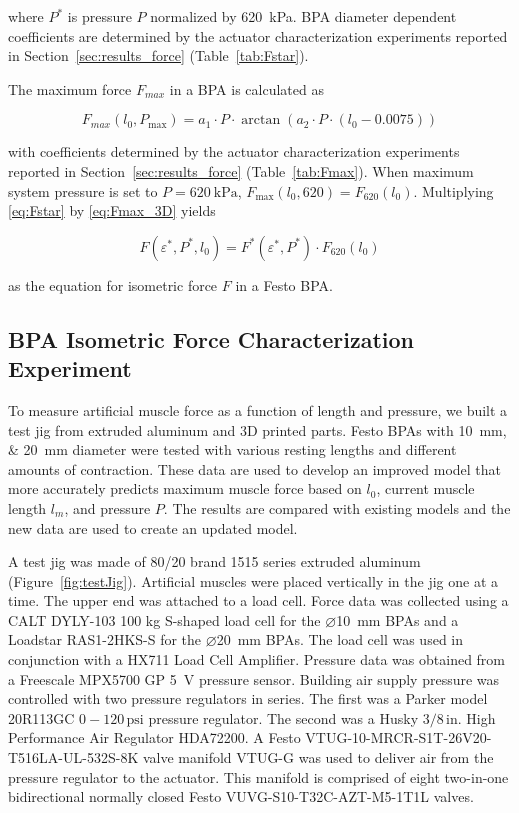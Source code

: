 where $P^*$ is pressure $P$ normalized by \qty{620}{\kPa}. BPA diameter dependent coefficients are determined by the actuator characterization experiments reported in Section~\ref{sec:results_force} (Table~\ref{tab:Fstar}).

The maximum force $F_{max}$ in a BPA is calculated as

\begin{equation}
    F_{max}(l_{0},P_\text{max}) = a_1 \cdot P \cdot \arctan{(a_2 \cdot P \cdot (l_{0}-0.0075))} \label{eq:Fmax_3D}
\end{equation}

with coefficients determined by the actuator characterization experiments reported in Section~\ref{sec:results_force} (Table~\ref{tab:Fmax}). When maximum system pressure is set to $P=\qty{620}{\kPa}$, $F_\text{max}(l_{0},620) = F_{620}(l_{0})$. Multiplying \eqref{eq:Fstar} by \eqref{eq:Fmax_3D} yields

 \begin{equation}
   F(\varepsilon^*,P^*,l_{0}) = F^*(\varepsilon^*,P^*) \cdot F_{620}(l_{0}) \label{eq:force}
\end{equation}

as the equation for isometric force $F$ in a Festo BPA.

\subsection{BPA Isometric Force Characterization Experiment}\label{sec:force_experiment}


To measure artificial muscle force as a function of length and pressure, we built a test jig from extruded aluminum and 3D printed parts. Festo BPAs with \qtylist{10;20}{\mm} diameter were tested with various resting lengths and different amounts of contraction. These data are used to develop an improved model that more accurately predicts maximum muscle force based on $l_0$, current muscle length $l_{m}$, and pressure $P$. The results are compared with existing models and the new data are used to create an updated model. 

A test jig was made of 80/20 brand 1515 series extruded aluminum (Figure~\ref{fig:testJig}). Artificial muscles were placed vertically in the jig one at a time. The upper end was attached to a load cell.
Force data was collected using a CALT DYLY-103 100 kg S-shaped load cell for the $\diameter$\qty{10}{\mm} BPAs and a Loadstar RAS1-2HKS-S for the $\diameter$\qty{20}{\mm} BPAs. The load cell was used in conjunction with a HX711 Load Cell Amplifier. Pressure data was obtained from a Freescale MPX5700 GP \qty{5}{\volt} pressure sensor. Building air supply pressure was controlled with two pressure regulators in series. The first was a Parker model 20R113GC $0-120\,\text{psi}$ pressure regulator. The second was a Husky $3/8\,\text{in.}$ High Performance Air Regulator HDA72200. A Festo VTUG-10-MRCR-S1T-26V20-T516LA-UL-532S-8K valve manifold VTUG-G was used to deliver air from the pressure regulator to the actuator. This manifold is comprised of eight two-in-one bidirectional normally closed Festo VUVG-S10-T32C-AZT-M5-1T1L valves. 

